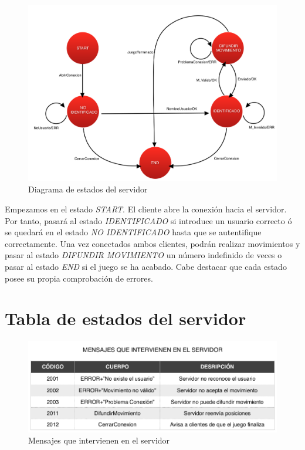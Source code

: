 \begin{figure}[h]
	\centering
	\includegraphics[width=.8\textwidth]{img/1}
	\caption{Diagrama de estados del servidor}
\end{figure}
	

Empezamos en el estado \textit{START}. El cliente abre la conexión hacia el servidor. Por tanto, pasará al estado \textit{IDENTIFICADO} si introduce un usuario correcto ó se quedará en el estado \textit{NO IDENTIFICADO} hasta que se autentifique correctamente. Una vez conectados ambos clientes, podrán realizar movimientos y pasar al estado \textit{DIFUNDIR MOVIMIENTO} un número indefinido de veces o pasar al estado \textit{END} si el juego se ha acabado. Cabe destacar que cada estado posee su propia comprobación de errores.
	












\newpage


\section{Tabla de estados del servidor}

\begin{figure}[h]
	\centering
	\includegraphics[width=.8\textwidth]{img/3}
	\caption{Mensajes que intervienen en el servidor}
\end{figure}







